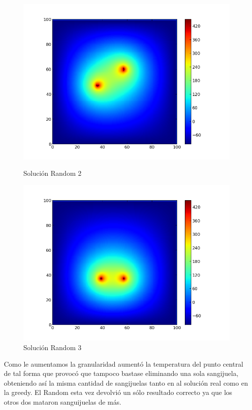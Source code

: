 \clearpage
\begin{figure}[htb]
\begin{center}
\includegraphics[scale=0.40]{imagenes/test6_g08_random_2.png} 
\caption{Solución Random 2} 

        \end{center}
\endminipage\hfill
{}
\begin{center}
\includegraphics[scale=0.40]{imagenes/test6_g08_random_3.png} 
\caption{Solución Random 3} 
        \end{center}
\endminipage\hfill 
\end{figure}

Como le aumentamos la granularidad aumentó la temperatura del punto central de tal forma que provocó que tampoco bastase eliminando una sola sangijuela, obteniendo así la misma cantidad de sangijuelas tanto en al solución real como en la greedy. El Random esta vez devolvió un sólo resultado correcto ya que los otros dos mataron sanguijuelas de más.
